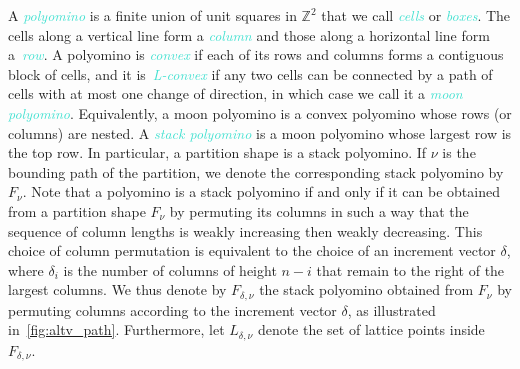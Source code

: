 \documentclass[11pt]{amsart}
\newcounter{height}
\newcommand{\dfn}[1]{\textcolor{Turquoise}{\emph{#1}}}
\theoremstyle{definition}
\begin{document}
A \dfn{polyomino} is a finite union of unit squares in $\mathbb{Z}^2$ that we call \dfn{cells} or \dfn{boxes}. The cells along a vertical line form a \dfn{column} and those along a horizontal line form a~\dfn{row}. A polyomino is \dfn{convex} if each of its rows and columns forms a contiguous block of cells, and it is~\dfn{L-convex} if any two cells can be connected by a path of cells with at most one change of direction, in which case we call it a \dfn{moon polyomino}. Equivalently, a moon polyomino is a convex polyomino whose rows (or columns) are nested. A \dfn{stack polyomino} is a moon polyomino whose largest row is the top row. In particular, a partition shape is a stack polyomino.  If $\nu$ is the bounding path of the partition, we denote the corresponding stack polyomino by $F_\nu$. Note that a polyomino is a stack polyomino if and only if it can be obtained from a partition shape $F_\nu$ by permuting its columns in such a way that the sequence of column lengths is weakly increasing then weakly decreasing. This choice of column permutation is equivalent to the choice of an increment vector $\delta$, where $\delta_i$ is the number of columns of height $n-i$ that remain to the right of the largest columns. We thus denote by $F_{\delta,\nu}$ the stack polyomino obtained from $F_\nu$ by permuting columns according to the increment vector $\delta$, as illustrated in~\cref{fig:altv_path}. Furthermore, let $L_{\delta,\nu}$ denote the set of lattice points inside $F_{\delta,\nu}$.
\end{document}
